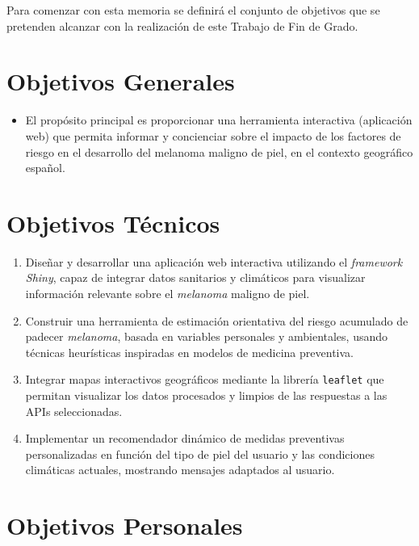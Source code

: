 
Para comenzar con esta memoria se definirá el conjunto de objetivos que se pretenden alcanzar con la realización de este Trabajo de Fin de Grado. 



\section*{Objetivos Generales}

\begin{itemize}
    \item El propósito principal es proporcionar una herramienta interactiva (aplicación web) que permita informar y concienciar sobre el impacto de los factores de riesgo en el desarrollo del melanoma maligno de piel, en el contexto geográfico español.
\end{itemize}

\section{Objetivos Técnicos}

\begin{enumerate}
    \item Diseñar y desarrollar una aplicación web interactiva utilizando el \textit{framework} \textit{Shiny}, capaz de integrar datos sanitarios y climáticos para visualizar información relevante sobre el \textit{melanoma} maligno de piel.

    \item Construir una herramienta de estimación orientativa del riesgo acumulado de padecer \textit{melanoma}, basada en variables personales y ambientales, usando técnicas heurísticas inspiradas en modelos de medicina preventiva.

    \item Integrar mapas interactivos geográficos mediante la librería \texttt{leaflet} que permitan visualizar los datos procesados y limpios de las respuestas a las APIs seleccionadas.

    \item Implementar un recomendador dinámico de medidas preventivas personalizadas en función del tipo de piel del usuario y las condiciones climáticas actuales, mostrando mensajes adaptados al usuario.
\end{enumerate}

\section{Objetivos Personales}


